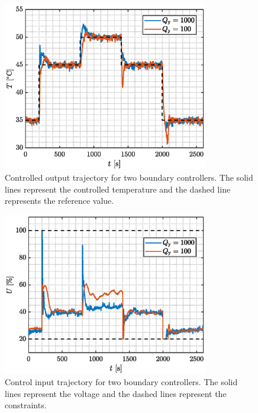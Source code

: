 \documentclass[preprint,12pt]{elsarticle}
\begin{document}
\begin{figure}
	\begin{center}
		\includegraphics[width=0.8\textwidth]{images/CV_boundaries}
		\caption{Controlled output trajectory for two boundary controllers. The solid lines represent the controlled temperature and the dashed line represents the reference value.}
		\label{fig:CV_boundaries}
	\end{center}
\end{figure}

\begin{figure}
	\begin{center}
		\includegraphics[width=0.8\textwidth]{images/MV_boundaries}
		\caption{Control input trajectory for two boundary controllers. The solid lines represent the voltage and the dashed lines represent the constraints.}
		\label{fig:MV_boundaries}
	\end{center}
\end{figure}
\end{document}
